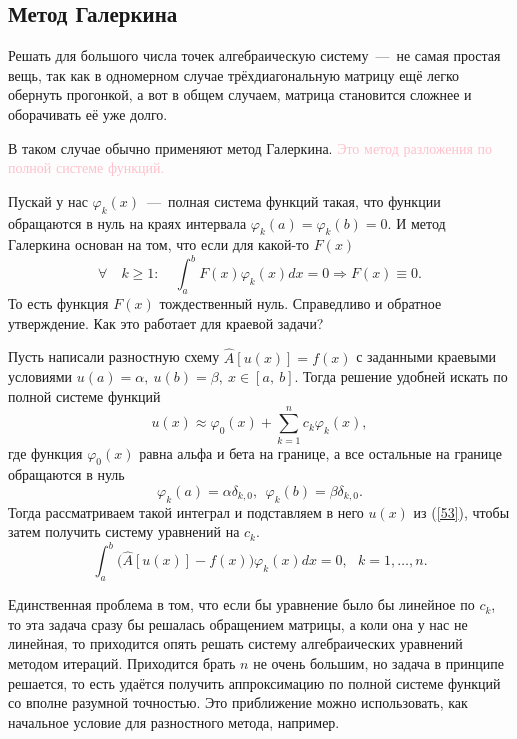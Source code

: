 \documentclass[a4,14pt,russian]{article}
\begin{document}
\subsection{Метод Галеркина}
    Решать для большого числа точек алгебраическую систему~---~не самая простая вещь, так как в одномерном случае трёхдиагональную матрицу ещё легко обернуть прогонкой, а вот в общем случаем, матрица становится сложнее и оборачивать её уже долго.\par
    В таком случае обычно применяют метод Галеркина. \textcolor{pink}{Это метод разложения по полной системе функций.}\par
    Пускай у нас $\varphi_k (x)$~---~полная система функций такая, что функции обращаются в нуль на краях интервала $\varphi_k (a) =\varphi_k (b) = 0$. И метод Галеркина основан на том, что если для какой-то $F(x)$
    \begin{equation}
     \forall \quad k\ge1: \quad\int_a^b F(x)\varphi_k (x)dx=0 \Rightarrow F(x) \equiv 0.
    \end{equation}
    То есть функция $F(x)$ тождественный нуль. Справедливо и обратное утверждение. Как это работает для краевой задачи?\par
    Пусть написали разностную схему $\hat A [u(x)]=f(x)$ с заданными краевыми условиями $u(a)=\alpha,\  u(b) = \beta, \ x \in [a,\ b]$. Тогда решение удобней искать по полной системе функций
    \begin{equation}\label{53}
     u(x) \approx \varphi_0(x) + \sum_{k=1}^nc_k\varphi_k(x),
    \end{equation}
    где функция $\varphi_0(x)$ равна альфа и бета на границе, а все остальные на границе обращаются в нуль 
    \begin{equation}
     \varphi_k(a)=\alpha\delta_{k,0},\ \ \varphi_k(b)=\beta\delta_{k,0}.
    \end{equation}
    Тогда рассматриваем такой интеграл и подставляем в него $u(x)$ из (\ref{53}), чтобы затем получить систему уравнений на $c_k$.
    \begin{equation}
     \int_a^b \biggl(\hat A [u(x)] - f(x)\biggr)\varphi_k(x)dx = 0,\ \ \ k=1,\ldots,n.
    \end{equation}\par
    Единственная проблема в том, что если бы уравнение было бы линейное по $c_k$, то эта задача сразу бы решалась обращением матрицы, а коли она у нас не линейная, то приходится опять решать систему алгебраических уравнений методом итераций. Приходится брать $n$ не очень большим, но задача в принципе решается, то есть удаётся получить аппроксимацию по полной системе функций со вполне разумной точностью. Это приближение можно использовать, как начальное условие для разностного метода, например.
\end{document}

